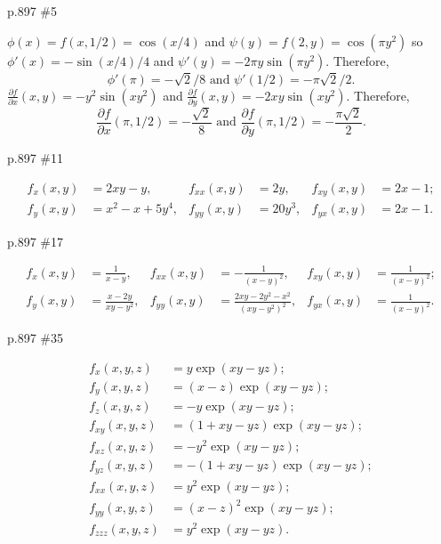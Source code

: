 \begin{practice}p.897 \#5\end{practice}
\begin{pracsol}
  $\phi(x)=f(x,1/2)=\cos(x/4)$ and $\psi(y)=f(2,y)=\cos(\pi y^2)$ so $\phi'(x)=-\sin(x/4)/4$ and $\psi'(y)=-2\pi y\sin(\pi y^2)$. Therefore,
  \[\phi'(\pi)=-\sqrt2/8\text{ and }\psi'(1/2)=-\pi\sqrt2/2.\]
  $\frac{\partial f}{\partial x}(x,y)=-y^2\sin(xy^2)$ and $\frac{\partial f}{\partial y}(x,y)=-2xy\sin(xy^2)$. Therefore,
  \[\frac{\partial f}{\partial x}(\pi,1/2)=-\frac{\sqrt2}8\text{ and }\frac{\partial f}{\partial y}(\pi,1/2)=-\frac{\pi\sqrt2}{2}.\]
\end{pracsol}

\begin{practice}p.897 \#11\end{practice}
\begin{pracsol}
  \begin{align*}
    f_x(x,y)&=2xy-y, &f_{xx}(x,y)&=2y, &f_{xy}(x,y)&=2x-1;\\
    f_y(x,y)&=x^2-x+5y^4, &f_{yy}(x,y)&=20y^3, &f_{yx}(x,y)&=2x-1.
  \end{align*}
\end{pracsol}

\begin{practice}p.897 \#17\end{practice}
\begin{pracsol}
  \begin{align*}
    f_x(x,y) &= \frac1{x-y}, &f_{xx}(x,y) &= -\frac1{(x-y)^2}, &f_{xy}(x,y) &= \frac1{(x-y)^2};\\
    f_y(x,y) &= \frac{x-2y}{xy-y^2}, &f_{yy}(x,y) &= \frac{2xy-2y^2-x^2}{(xy-y^2)^2}, &f_{yx}(x,y) &= \frac1{(x-y)^2}.
  \end{align*}
\end{pracsol}

\begin{practice}p.897 \#35\end{practice}
\begin{pracsol}
  \begin{align*}
    f_x(x,y,z) &= y\exp(xy-yz);\\
    f_y(x,y,z) &=(x-z)\exp(xy-yz);\\
    f_z(x,y,z) &=-y\exp(xy-yz);\\
    f_{xy}(x,y,z) &= (1+xy-yz)\exp(xy-yz);\\
    f_{xz}(x,y,z) &= -y^2\exp(xy-yz);\\
    f_{yz}(x,y,z) &= -(1+xy-yz)\exp(xy-yz);\\
    f_{xx}(x,y,z) &= y^2\exp(xy-yz);\\
    f_{yy}(x,y,z) &= (x-z)^2\exp(xy-yz);\\
    f_{zzz}(x,y,z) &= y^2\exp(xy-yz).
  \end{align*}
\end{pracsol}

